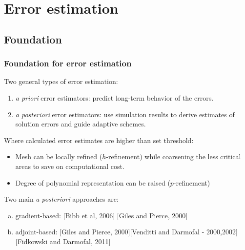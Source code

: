 \documentclass{beamer}
\begin{document}





\section[Error estimates]{Error estimation}

\subsection{Foundation}
\begin{frame}
\frametitle{Foundation for error estimation}
\scriptsize
Two general types of error estimation:
\begin{enumerate}[1.]
\item \textit{a priori} error estimators:  predict long-term behavior of the errors. 
\item \textit{a posteriori} error estimators: use simulation results to derive estimates of solution errors and guide adaptive schemes.
\end{enumerate}

Where calculated error estimates are higher than set threshold:
\begin{itemize}
\scriptsize
\item Mesh can be locally refined ($h$-refinement) while coarsening the less critical areas to save on computational cost. 
\item Degree of polynomial representation can be raised ($p$-refinement)
\end{itemize}

Two main \textit{a posteriori} approaches are:
\begin{enumerate}[(a)]
\scriptsize
\item gradient-based: [Bibb et al, 2006] [Giles and Pierce, 2000]
\item adjoint-based: [Giles and Pierce, 2000][Venditti and Darmofal - 2000,2002][Fidkowski and Darmofal, 2011] 
\end{enumerate}

\end{frame}
\end{document}
